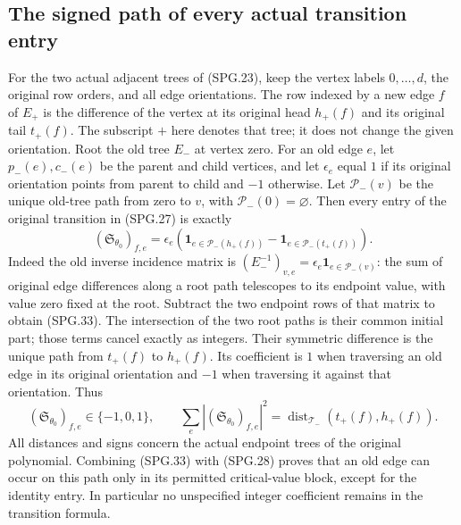 \subsection{The signed path of every actual transition entry}

For the two actual adjacent trees of (SPG.23), keep the vertex labels
\(0,\ldots,d\), the original row orders, and all edge orientations.
The row indexed by a new edge \(f\) of \(E_+\) is the difference
of the vertex at its original head \(h_+(f)\) and its original tail
\(t_+(f)\). The subscript \(+\) here denotes that tree; it does
not change the given orientation. Root the old tree \(E_-\) at
vertex zero. For an old edge \(e\), let \(p_-(e),c_-(e)\) be
the parent and child vertices, and let \(\epsilon_e\) equal \(1\)
if its original orientation points from parent to child and \(-1\)
otherwise. Let \(\mathcal P_-(v)\) be the unique old-tree path
from zero to \(v\), with \(\mathcal P_-(0)=\varnothing\).
Then every entry of the original transition in (SPG.27) is exactly
\[
 (\mathfrak S_{\theta_0})_{f,e}
   =\epsilon_e\left(
       \mathbf1_{e\in\mathcal P_-(h_+(f))}
        -\mathbf1_{e\in\mathcal P_-(t_+(f))}\right).
 \tag{SPG.33}\label{GraphV2:eq:spg-signed-path}
\]
Indeed the old inverse incidence matrix is
\((E_-^{-1})_{v,e}=\epsilon_e\mathbf1_{e\in\mathcal P_-(v)}\):
the sum of original edge differences along a root path telescopes
to its endpoint value, with value zero fixed at the root. Subtract
the two endpoint rows of that matrix to obtain (SPG.33). The
intersection of the two root paths is their common initial part;
those terms cancel exactly as integers. Their symmetric difference
is the unique path from \(t_+(f)\) to \(h_+(f)\). Its coefficient
is \(1\) when traversing an old edge in its original orientation
and \(-1\) when traversing it against that orientation. Thus
\[
 (\mathfrak S_{\theta_0})_{f,e}\in\{-1,0,1\},\qquad
 \sum_e |(\mathfrak S_{\theta_0})_{f,e}|^2
   =\operatorname{dist}_{\mathcal T_-}(t_+(f),h_+(f)).
 \tag{SPG.34}\label{GraphV2:eq:spg-path-count}
\]
All distances and signs concern the actual endpoint trees of the
original polynomial. Combining (SPG.33) with (SPG.28) proves that
an old edge can occur on this path only in its permitted
critical-value block, except for the identity entry. In particular
no unspecified integer coefficient remains in the transition formula.

